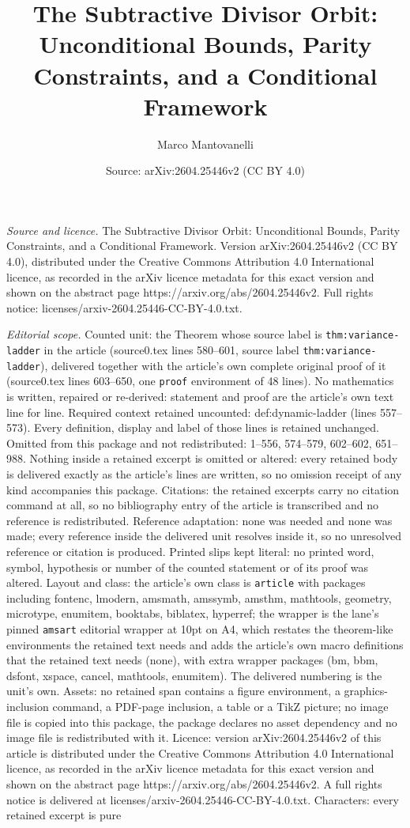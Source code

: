 \documentclass[10pt,a4paper]{amsart}
\title[The Subtractive Divisor Orbit: Unconditional Bounds, Parity ]{The Subtractive Divisor Orbit: Unconditional Bounds, Parity Constraints, and a Conditional Framework}
\author{Marco Mantovanelli}
\date{Source: arXiv:2604.25446v2 (CC BY 4.0)}
\begin{document}
\maketitle

\noindent\emph{Source and licence.} The Subtractive Divisor Orbit: Unconditional Bounds, Parity Constraints, and a Conditional Framework. Version arXiv:2604.25446v2 (CC BY 4.0), distributed under the Creative Commons Attribution 4.0 International licence, as recorded in the arXiv licence metadata for this exact version and shown on the abstract page https://arxiv.org/abs/2604.25446v2. Full rights notice: licenses/arxiv-2604.25446-CC-BY-4.0.txt.\par\smallskip

\noindent\textit{Editorial scope.} Counted unit: the Theorem whose source label is \texttt{thm:variance-ladder} in the article (source0.tex lines 580--601, source label \texttt{thm:variance-ladder}), delivered together with the article's own complete original proof of it (source0.tex lines 603--650, one \texttt{proof} environment of 48 lines). No mathematics is written, repaired or re-derived: statement and proof are the article's own text line for line. Required context retained uncounted: def:dynamic-ladder (lines 557--573). Every definition, display and label of those lines is retained unchanged. Omitted from this package and not redistributed: 1--556, 574--579, 602--602, 651--988. Nothing inside a retained excerpt is omitted or altered: every retained body is delivered exactly as the article's lines are written, so no omission receipt of any kind accompanies this package. Citations: the retained excerpts carry no citation command at all, so no bibliography entry of the article is transcribed and no reference is redistributed. Reference adaptation: none was needed and none was made; every reference inside the delivered unit resolves inside it, so no unresolved reference or citation is produced. Printed slips kept literal: no printed word, symbol, hypothesis or number of the counted statement or of its proof was altered. Layout and class: the article's own class is \texttt{article} with packages including fontenc, lmodern, amsmath, amssymb, amsthm, mathtools, geometry, microtype, enumitem, booktabs, biblatex, hyperref; the wrapper is the lane's pinned \texttt{amsart} editorial wrapper at 10pt on A4, which restates the theorem-like environments the retained text needs and adds the article's own macro definitions that the retained text needs (none), with extra wrapper packages (bm, bbm, dsfont, xspace, cancel, mathtools, enumitem). The delivered numbering is the unit's own. Assets: no retained span contains a figure environment, a graphics-inclusion command, a PDF-page inclusion, a table or a TikZ picture; no image file is copied into this package, the package declares no asset dependency and no image file is redistributed with it. Licence: version arXiv:2604.25446v2 of this article is distributed under the Creative Commons Attribution 4.0 International licence, as recorded in the arXiv licence metadata for this exact version and shown on the abstract page https://arxiv.org/abs/2604.25446v2. A full rights notice is delivered at licenses/arxiv-2604.25446-CC-BY-4.0.txt. Characters: every retained excerpt is pure 
\end{document}
